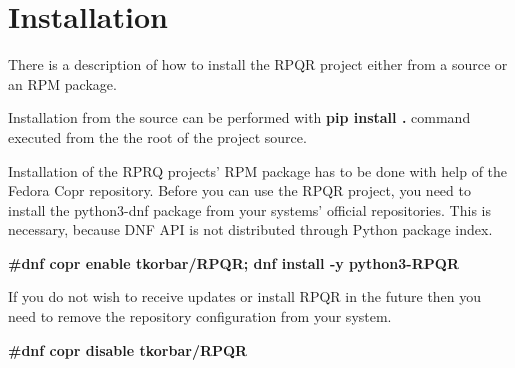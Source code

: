 \chapter{Installation}

There is a description of how to install the RPQR project either from a source or an RPM package.


Installation from the source can be performed with \textbf{pip install .} command executed from the
the root of the project source.


Installation of the RPRQ projects' RPM package has to be done with help of the Fedora Copr repository.
Before you can use the RPQR project, you need to install the python3-dnf package from your
systems' official repositories. This is necessary, because DNF API is not distributed through Python
package index.

\textbf{\#dnf copr enable tkorbar/RPQR; dnf install -y python3-RPQR}


If you do not wish to receive updates or install RPQR in the future then you need to remove the
repository configuration from your system.


\textbf{\#dnf copr disable tkorbar/RPQR}

